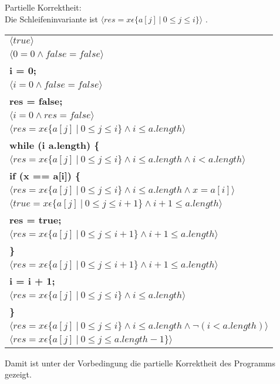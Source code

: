 \documentclass[12pt]{article}
\begin{document}
\subsection{}
\begin{center}
    Partielle Korrektheit:\\
    Die Schleifeninvariante ist $ \langle res = x \epsilon \{a[j] \ | \ 0 \leq j \leq i\} \rangle$ .
    \bigbreak
    \begin{tabular}{l}
        $\langle true \rangle$\\
        $\langle 0 = 0 \wedge false = false \rangle$\\
        \quad \textbf{i = 0;}\\
        $\langle i = 0 \wedge false = false \rangle$\\
        \quad \textbf{res = false;}\\
        $\langle i = 0 \wedge res = false \rangle$\\
        $\langle res = x \epsilon \{a[j] \ | \ 0 \leq j \leq i\} \land i \leq a.length \rangle$\\
        \quad \textbf{while (i \pmb{$<$} a.length) \{}\\
        \quad \quad $\langle res = x \epsilon \{a[j] \ | \ 0 \leq j \leq i\} \wedge i \leq a.length \land i < a.length \rangle$\\
        \quad \quad \quad \textbf{if (x == a[i]) \{}\\
        \quad \quad \quad \quad $\langle res = x \epsilon \{a[j] \ | \ 0 \leq j \leq i\} \wedge i \leq a.length \wedge x = a[i] \rangle$\\
        \quad \quad \quad \quad $\langle true = x \epsilon \{a[j] \ | \ 0 \leq j \leq i+1\} \wedge i+1 \leq a.length \rangle$\\
        \quad \quad \quad \quad \quad \textbf{res = true;}\\
        \quad \quad \quad \quad $\langle res = x \epsilon \{a[j] \ | \ 0 \leq j \leq i+1\} \wedge i+1 \leq a.length \rangle$\\
        \quad \quad \quad \textbf{\}}\\
        \quad \quad $\langle res = x \epsilon \{a[j] \ | \ 0 \leq j \leq i+1\} \wedge i+1 \leq a.length \rangle$\\
        \quad \quad \quad \textbf{i = i + 1;}\\
        \quad \quad $\langle res = x \epsilon \{a[j] \ | \ 0 \leq j \leq i\} \wedge i \leq a.length \rangle$\\
        \quad \textbf{\}}\\
        $\langle res = x \epsilon \{a[j] \ | \ 0 \leq j \leq i\} \wedge i \leq a.length \wedge \neg(i < a.length) \rangle$\\
        $\langle res = x \epsilon \{a[j] \ | \ 0 \leq j \leq a.length-1\} \rangle$\\
    \end{tabular}
    \bigbreak
    Damit ist unter der Vorbedingung die partielle Korrektheit des Programms gezeigt.
\end{center}
\end{document}
